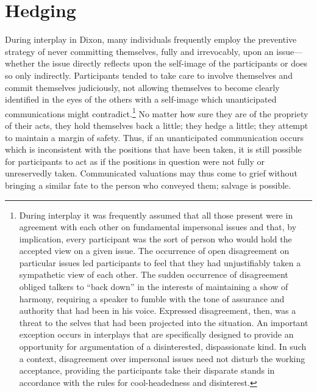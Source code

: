 \documentclass[openany,nobib]{tufte-book}
\begin{document}
\hypertarget{hedging}{%
\section{Hedging}\label{hedging}}

During interplay in Dixon, many individuals frequently employ the
preventive strategy of never committing themselves, fully and
irrevocably, upon an issue---whether the issue directly reflects upon
the self-image of the participants or does so only indirectly.
Participants tended to take care to involve themselves and commit
themselves judiciously, not allowing themselves to become clearly
identified in the eyes of the others with a self-image which
unanticipated communications might contradict.\footnote{During interplay
  it was frequently assumed that all those present were in agreement
  with each other on fundamental impersonal issues and that, by
  implication, every participant was the sort of person who would hold
  the accepted view on a given issue. The occurrence of open
  disagreement on particular issues led participants to feel that they
  had unjustifiably taken a sympathetic view of each other. The sudden
  occurrence of disagreement obliged talkers to ``back down'' in the
  interests of maintaining a show of harmony, requiring a speaker to
  fumble with the tone of assurance and authority that had been in his
  voice. Expressed disagreement, then, was a threat to the selves that
  had been projected into the situation. An important exception occurs
  in interplays that are specifically designed to provide an opportunity
  for argumentation of a disinterested, dispassionate kind. In such a
  context, disagreement over impersonal issues need not disturb the
  working acceptance, providing the participants take their disparate
  stands in accordance with the rules for cool-headedness and
  disinterest.} No matter how sure they are of the propriety of their
acts, they hold themselves back a little; they hedge a little; they
attempt to maintain a margin of safety. Thus, if an unanticipated
communication occurs which is inconsistent with the positions that have
been taken, it is still possible for participants to act as if the
positions in question were not fully or unreservedly taken. Communicated
valuations may thus come to grief without bringing a similar fate to the
person who conveyed them; salvage is possible.
\end{document}

